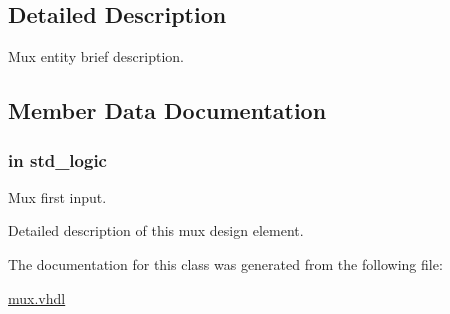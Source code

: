 \subsection{Detailed Description}
Mux entity brief description. 

\subsection{Member Data Documentation}
\hypertarget{classmux__using__with_af60b470af850edfe2a766ef15ffcc7c1}{
\subsubsection[{din\-\_\-0}]{ {\bfseries \textcolor{vhdlkeyword}{in}\textcolor{vhdlchar}{ }} {\bfseries \textcolor{comment}{std\-\_\-logic}\textcolor{vhdlchar}{ }} \hspace{0.3cm}{\ttfamily [Port]}}}\label{classmux__using__with_af60b470af850edfe2a766ef15ffcc7c1}


Mux first input. 

Detailed description of this mux design element. 

The documentation for this class was generated from the following file\-:\begin{DoxyCompactItemize}
\item 
\hyperlink{mux_8vhdl}{mux.\-vhdl}\end{DoxyCompactItemize}
